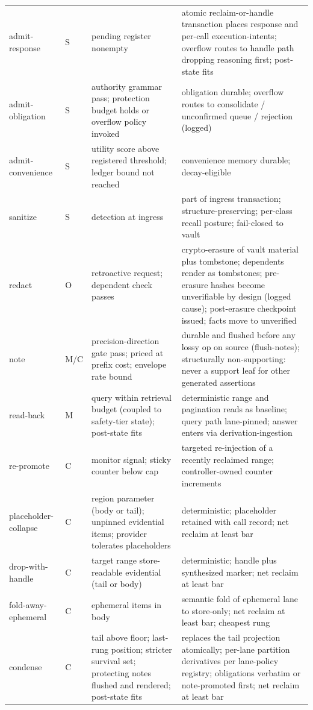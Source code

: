 \documentclass[11pt]{article}
\begin{document}
{\begin{longtable}{@{}p{2.35cm}p{1.15cm}p{4.6cm}p{5.6cm}@{}}
admit-response & S & pending register nonempty & atomic reclaim-or-handle transaction places response and per-call execution-intents; overflow routes to handle path dropping reasoning first; post-state fits \\
admit-obligation & S & authority grammar pass; protection budget holds or overflow policy invoked & obligation durable; overflow routes to consolidate / unconfirmed queue / rejection (logged) \\
admit-convenience & S & utility score above registered threshold; ledger bound not reached & convenience memory durable; decay-eligible \\
sanitize & S & detection at ingress & part of ingress transaction; structure-preserving; per-class recall posture; fail-closed to vault \\
redact & O & retroactive request; dependent check passes & crypto-erasure of vault material plus tombstone; dependents render as tombstones; pre-erasure hashes become unverifiable by design (logged cause); post-erasure checkpoint issued; facts move to unverified \\
note & M/C & precision-direction gate pass; priced at prefix cost; envelope rate bound & durable and flushed before any lossy op on source (flush-notes); structurally non-supporting: never a support leaf for other generated assertions \\
read-back & M & query within retrieval budget (coupled to safety-tier state); post-state fits & deterministic range and pagination reads as baseline; query path lane-pinned; answer enters via derivation-ingestion \\
re-promote & C & monitor signal; sticky counter below cap & targeted re-injection of a recently reclaimed range; controller-owned counter increments \\
placeholder-collapse & C & region parameter (body or tail); unpinned evidential items; provider tolerates placeholders & deterministic; placeholder retained with call record; net reclaim at least bar \\
drop-with-handle & C & target range store-readable evidential (tail or body) & deterministic; handle plus synthesized marker; net reclaim at least bar \\
fold-away-ephemeral & C & ephemeral items in body & semantic fold of ephemeral lane to store-only; net reclaim at least bar; cheapest rung \\
condense & C & tail above floor; last-rung position; stricter survival set; protecting notes flushed and rendered; post-state fits & replaces the tail projection atomically; per-lane partition derivatives per lane-policy registry; obligations verbatim or note-promoted first; net reclaim at least bar \\

\end{longtable}}
\end{document}
